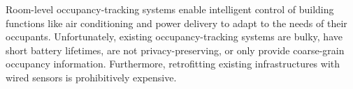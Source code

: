 Room-level occupancy-tracking systems enable intelligent control of building functions like air conditioning and power delivery to adapt to the needs of their occupants.
Unfortunately, existing occupancy-tracking systems are bulky, have short battery lifetimes, are not privacy-preserving, or only provide coarse-grain occupancy information.
Furthermore, retrofitting existing infrastructures with wired sensors is prohibitively expensive. %

